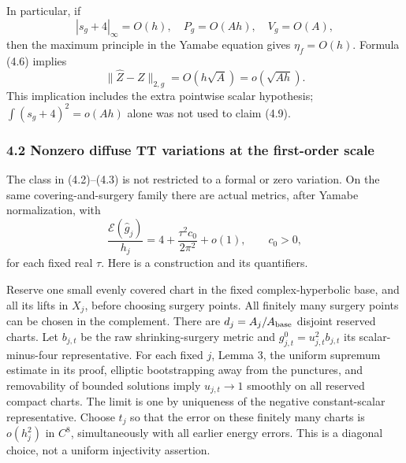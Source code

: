 \documentclass[
  10pt,
]{article}
\begin{document}
In particular, if \[
 |s_g+4|_\infty=O(h),\quad P_g=O(Ah),\quad V_g=O(A),
\] then the maximum principle in the Yamabe equation gives
\(\eta_f=O(h)\). Formula (4.6) implies \[
 \|\widehat Z-Z\|_{2,g}=O(h\sqrt A)=o(\sqrt{Ah}). \tag{4.9}
\] This implication includes the extra pointwise scalar hypothesis;
\(\int(s_g+4)^2=o(Ah)\) alone was not used to claim (4.9).

\hypertarget{nonzero-diffuse-tt-variations-at-the-first-order-scale}{%
\subsubsection{4.2 Nonzero diffuse TT variations at the first-order
scale}\label{nonzero-diffuse-tt-variations-at-the-first-order-scale}}

The class in (4.2)--(4.3) is not restricted to a formal or zero
variation. On the same covering-and-surgery family there are actual
metrics, after Yamabe normalization, with \[
 \boxed{\frac{\mathcal E(\widehat g_j)}{h_j}
       =4+\frac{\tau^2c_0}{2\pi^2}+o(1),\qquad c_0>0,} \tag{4.10}
\] for each fixed real \(\tau\). Here is a construction and its
quantifiers.

Reserve one small evenly covered chart in the fixed complex-hyperbolic
base, and all its lifts in \(X_j\), before choosing surgery points. All
finitely many surgery points can be chosen in the complement. There are
\(d_j=A_j/A_{\rm base}\) disjoint reserved charts. Let \(b_{j,t}\) be
the raw shrinking-surgery metric and \(g^0_{j,t}=u_{j,t}^2b_{j,t}\) its
scalar-minus-four representative. For each fixed \(j\), Lemma 3, the
uniform supremum estimate in its proof, elliptic bootstrapping away from
the punctures, and removability of bounded solutions imply
\(u_{j,t}\to1\) smoothly on all reserved compact charts. The limit is
one by uniqueness of the negative constant-scalar representative. Choose
\(t_j\) so that the error on these finitely many charts is \(o(h_j^2)\)
in \(C^8\), simultaneously with all earlier energy errors. This is a
diagonal choice, not a uniform injectivity assertion.
\end{document}
